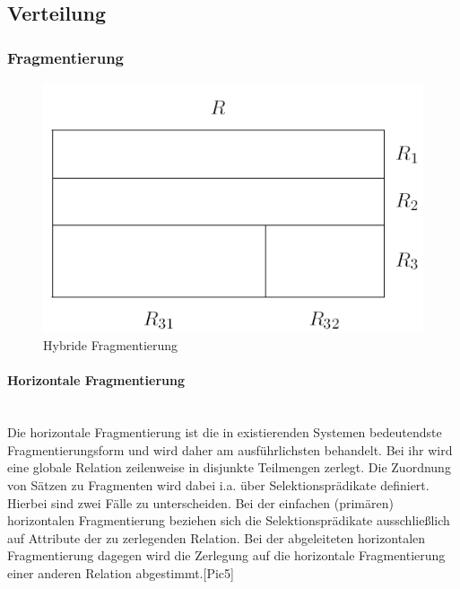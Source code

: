 \documentclass[letterpaper, 12pt]{article}
\let\tempsubsection\subsection
\renewcommand\subsection[1]{\vspace{0cm}\tempsubsection{#1}\vspace{0cm}}
\let\tempsubsubsection\subsubsection
\renewcommand\subsubsection[1]{\vspace{0cm}\tempsubsubsection{#1}\vspace{0cm}}
\begin{document}
\subsection{Verteilung}
\subsubsection{Fragmentierung}
\begin{figure}[hp]
\centering
\includegraphics[scale=0.80]{Frag.png}
\caption{Hybride Fragmentierung}
\label{}
\end{figure}
\paragraph{Horizontale Fragmentierung\\\\}
Die horizontale Fragmentierung ist die in existierenden Systemen bedeutendste Fragmentierungsform und wird daher am ausführlichsten behandelt. Bei ihr wird eine globale Relation zeilenweise in disjunkte Teilmengen zerlegt. Die Zuordnung von Sätzen zu Fragmenten wird dabei i.a. über Selektionsprädikate definiert. Hierbei sind zwei Fälle zu unterscheiden. Bei der einfachen (primären) horizontalen Fragmentierung beziehen sich die Selektionsprädikate ausschließlich auf Attribute der zu zerlegenden Relation. Bei der abgeleiteten horizontalen Fragmentierung dagegen wird die Zerlegung auf die horizontale Fragmentierung einer anderen Relation abgestimmt.[Pic5]
\\\\
\newpage
\end{document}

